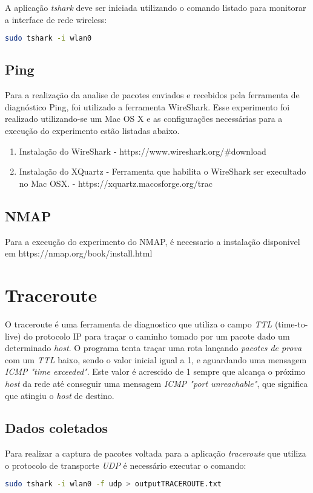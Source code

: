 \documentclass[a4paper]{report} %
\begin{document}
	A aplicação \textit{tshark} deve ser iniciada utilizando o comando listado para monitorar a interface de rede wireless:
\begin{lstlisting}[language=bash]
	sudo tshark -i wlan0
\end{lstlisting}


\subsection{Ping}
Para a realização da analise de pacotes enviados e recebidos pela ferramenta de diagnóstico Ping, foi utilizado a ferramenta WireShark. Esse experimento foi realizado utilizando-se um Mac OS X e as configurações necessárias para a execução do experimento estão listadas abaixo.

\begin{enumerate}
    \item Instalação do WireShark - https://www.wireshark.org/#download
    \item Instalação do XQuartz - Ferramenta que habilita o WireShark ser execultado no Mac OSX. - https://xquartz.macosforge.org/trac
\end{enumerate}

\subsection{NMAP}
Para a execução do experimento do NMAP, é necessario a instalação disponivel em
https://nmap.org/book/install.html



\section{Traceroute}
\label{sec_traceroute}
O traceroute é uma ferramenta de diagnostico que utiliza o campo \textit{TTL} (time-to-live) do protocolo IP para traçar o caminho tomado por um pacote dado um determinado \textit{host}. O programa tenta traçar uma rota lançando \textit{pacotes de prova} com um \textit{TTL} baixo, sendo o valor inicial igual a 1, e aguardando uma mensagem \textit{ICMP "time exceeded"}.  Este valor é acrescido de 1 sempre que alcança o próximo \textit{host} da rede até conseguir uma mensagem \textit{ICMP "port unreachable"}, que significa que atingiu o \textit{host} de destino.

\subsection{Dados coletados}
\label{sub_traceroute_dados}
Para realizar a captura de pacotes voltada para a aplicação \textit{traceroute} que utiliza o protocolo de transporte \textit{UDP} é necessário executar o comando:
\begin{lstlisting}[language=bash]
	sudo tshark -i wlan0 -f udp > outputTRACEROUTE.txt
\end{lstlisting}
\end{document}
